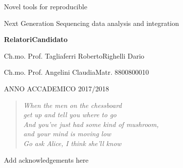 \documentclass[b5paper,oneside,british,intoc,bibliograph=totoc,index=totoc,BCOR10mm,twoside,openright]{book}
\numberwithin{equation}{section}
\numberwithin{figure}{section}
\begin{document}
\vspace{1.5cm}

\begin{center}
Novel tools for reproducible 

Next Generation Sequencing data analysis and integration
\par\end{center}

\vspace{1.5cm}

\textbf{\large{}Relatori}\hfill{}\textbf{\large{}Candidato}{\large \par}

Ch.mo. Prof. Tagliaferri Roberto\hfill{}Righelli Dario

Ch.mo. Prof. Angelini Claudia\hfill{}Matr. 8800800010

\vspace{1.5cm}

\begin{center}
ANNO ACCADEMICO 2017/2018
\par\end{center}

\cleardoublepage

\begin{quotation}
\begin{flushright}
\textit{
When the men on the chessboard\\get up and tell you where to go\\
And you've just had some kind of mushroom,\\and your mind is moving low\\
Go ask Alice, I think she'll know\\
}
\par\end{flushright}
\end{quotation}


\cleardoublepage
{}

Add acknowledgements here
%

\cleardoublepage


%


\hypersetup{hidelinks} %

\pagestyle{plain}\tableofcontents

\cleardoublepage{}
\pagestyle{fancy}
\end{document}
